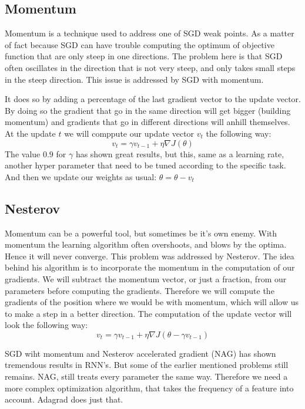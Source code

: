 {\subsection{Momentum}
Momentum is a technique used to address one of SGD weak points. As a matter of fact because SGD can have trouble computing the optimum of objective function that are only steep in one directions. The problem here is that SGD often oscillates in the direction that is not very steep, and only takes small steps in the steep direction. This issue is addressed by SGD with momentum. 

It does so by adding a percentage of the last gradient vector  to the update vector. By doing so the gradient that go in the same direction will get bigger (building momentum) and gradients that go in different directions will anhill themselves. 
 At the update $t$ we will comppute our update vector $v_t$ the following way:
\begin{equation}
v_t = \gamma v_{t-1} + \eta \nabla J (\theta)
\end{equation}
The value $0.9$ for $\gamma$ has shown great results, but this, same as a learning rate, another hyper parameter that need to be tuned according to the specific task. 
And then we update our weights as usual: $\theta = \theta - v_t$ 
\subsection{Nesterov}
Momentum can be a powerful tool, but sometimes be it's own enemy. With momentum the learning algorithm often overshoots, and blows by the  optima. Hence it will never converge. This problem was addressed by Nesterov. The idea behind his algorithm is to incorporate the momentum in the computation of our gradients. We will subtract the momentum vector, or just a fraction,  from our parameters before computing the gradients. Therefore we will compute the gradients of the position where we would be with momentum, which will allow us to make a step in a better direction. The computation of the update vector will look the following way:
\begin{equation}
v_t = \gamma v_{t-1} + \eta \nabla J (\theta -  \gamma v_{t-1})
\end{equation}

SGD wiht momentum and Nesterov accelerated gradient (NAG) has shown tremendous results in RNN's. But some of the earlier mentioned problems still remains.  NAG, still treats every parameter the same way. Therefore we need a more complex optimization algorithm, that takes the frequency of a feature into account. Adagrad does just that. 

}
